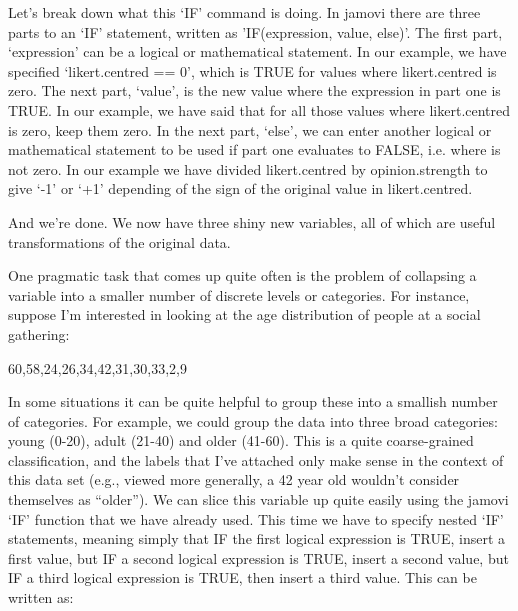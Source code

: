 Let's break down what this `IF' command is doing. In jamovi there are three parts to an `IF' statement, written as 'IF(expression, value, else)'. The first part, `expression' can be a logical or mathematical statement. In our example, we have specified `likert.centred == 0', which is TRUE for values where likert.centred is zero. The next part, `value', is the new value where the expression in part one is TRUE. In our example, we have said that for all those values where likert.centred is zero, keep them zero. In the next part, `else', we can enter another logical or mathematical statement to be used if part one evaluates to FALSE, i.e. where  is not zero. In our example we have divided likert.centred by opinion.strength to give `-1' or `+1' depending of the sign of the original value in likert.centred.

And we're done. We now have three shiny new variables, all of which are useful transformations of the original  data. 


One pragmatic task that comes up quite often is the problem of collapsing a variable into a smaller number of discrete levels or categories. For instance, suppose I'm interested in looking at the age distribution of people at a social gathering:
\begin{rblock1}
60,58,24,26,34,42,31,30,33,2,9
\end{rblock1}
In some situations it can be quite helpful to group these into a smallish number of categories. For example, we could group the data into three broad categories: young (0-20), adult (21-40) and older (41-60). This is a quite coarse-grained classification, and the labels that I've attached only make sense in the context of this data set (e.g., viewed more generally, a 42 year old wouldn't consider themselves as ``older''). We can slice this variable up quite easily using the jamovi `IF' function that we have already used. This time we have to specify nested `IF' statements, meaning simply that IF the first logical expression is TRUE, insert a first value, but IF a second logical expression is TRUE, insert a second value, but IF a third logical expression is TRUE, then insert a third value. This can be written as: 

